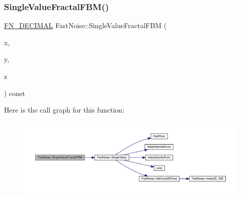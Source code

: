\subsubsection{\texorpdfstring{Single\+Value\+Fractal\+F\+B\+M()}{SingleValueFractalFBM()}\hspace{0.1cm}{\footnotesize\ttfamily [2/2]}}
{\footnotesize\ttfamily \mbox{\hyperlink{_fast_noise_8h_a75a9ef6d2541c4921815b885bfd449c3}{F\+N\+\_\+\+D\+E\+C\+I\+M\+AL}} Fast\+Noise\+::\+Single\+Value\+Fractal\+F\+BM (\begin{DoxyParamCaption}\item[{\mbox{\hyperlink{_fast_noise_8h_a75a9ef6d2541c4921815b885bfd449c3}{F\+N\+\_\+\+D\+E\+C\+I\+M\+AL}}}]{x,  }\item[{\mbox{\hyperlink{_fast_noise_8h_a75a9ef6d2541c4921815b885bfd449c3}{F\+N\+\_\+\+D\+E\+C\+I\+M\+AL}}}]{y,  }\item[{\mbox{\hyperlink{_fast_noise_8h_a75a9ef6d2541c4921815b885bfd449c3}{F\+N\+\_\+\+D\+E\+C\+I\+M\+AL}}}]{z }\end{DoxyParamCaption}) const\hspace{0.3cm}{\ttfamily [private]}}

Here is the call graph for this function\+:
\nopagebreak
\begin{figure}[H]
\begin{center}
\leavevmode
\includegraphics[width=350pt]{class_fast_noise_a9189fa5c0fa9d9871290ade57dabe022_cgraph}
\end{center}
\end{figure}
\mbox{\label{class_fast_noise_a9061e8fb70914a8aa976d861d21a4f63}} 
